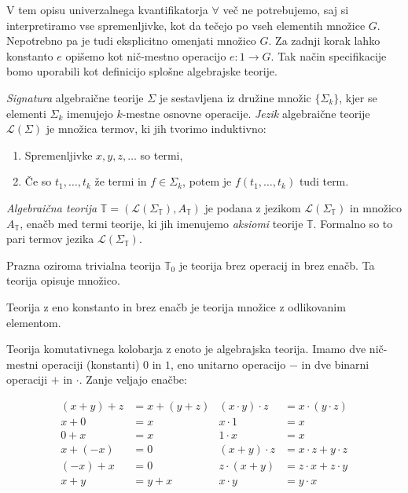 \documentclass[../kategoricna_logika.tex]{subfiles}
\begin{document}
V tem opisu univerzalnega kvantifikatorja $\forall$ več ne potrebujemo,
saj si interpretiramo vse spremenljivke, kot da tečejo po vseh elementih množice $G$.
Nepotrebno pa je tudi eksplicitno omenjati množico $G$.
Za zadnji korak lahko konstanto $e$ opišemo kot nič-mestno operacijo $e : 1 \to G$.
Tak način specifikacije bomo uporabili kot definicijo splošne algebrajske teorije.
%
\begin{definicija}
  \emph{Signatura} algebraične teorije $\Sigma$ je sestavljena iz družine
  množic $\lbrace \Sigma_k \rbrace$, kjer se elementi $\Sigma_k$
  imenujejo $k$-mestne osnovne operacije.
  \emph{Jezik} algebraične teorije $\mathcal{L}(\Sigma)$ je množica termov,
  ki jih tvorimo induktivno:
  \begin{enumerate}
  \item Spremenljivke $x,y,z, \ldots$ so termi,
  \item Če so $t_1, \ldots, t_k$ že termi in $f \in \Sigma_k$, potem
    je $f(t_1,\ldots, t_k)$ tudi term.
  \end{enumerate}
\end{definicija}
%
\begin{definicija}
  \emph{Algebraična teorija}
  $\mathbb{T} = (\mathcal{L}(\Sigma_\mathbb{T}), A_\mathbb{T})$ je podana z jezikom
  $\mathcal{L}(\Sigma_\mathbb{T})$ in množico $A_\mathbb{T}$, enačb med termi
  teorije, ki jih imenujemo \emph{aksiomi} teorije $\mathbb{T}$. Formalno so
  to pari termov jezika $\mathcal{L}(\Sigma_{\mathbb{T}})$.
\end{definicija}
\begin{primer}
  Prazna oziroma trivialna teorija $\mathbb{T}_0$ je teorija brez operacij in brez enačb.
  Ta teorija opisuje množico.
\end{primer}
\begin{primer}
Teorija z eno konstanto in brez enačb je teorija množice z odlikovanim elementom.
\end{primer}
\begin{primer}
  Teorija komutativnega kolobarja z enoto je algebrajska teorija.
  Imamo dve nič-mestni operaciji (konstanti) $0$ in $1$, eno unitarno operacijo
  $-$ in dve binarni operaciji $+$ in $\cdot$. Zanje veljajo enačbe:
  
\begin{align*}
  (x+y)+z &= x + (y + z) & (x \cdot y) \cdot z &= x \cdot (y \cdot z) \\
  x + 0 &= x & x \cdot 1 &= x \\
  0 + x &= x & 1\cdot x &= x \\
  x + (-x) &= 0 & (x+y)\cdot z &= x \cdot z + y\cdot z \\
  (-x) + x &= 0 & z \cdot (x+y) &= z \cdot x+ z\cdot y \\
  x + y &= y + x & x \cdot y &= y\cdot x
\end{align*}
\end{primer}
\end{document}
